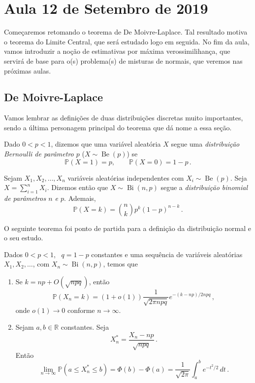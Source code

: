 \section{Aula 12 de Setembro de 2019}
\label{2019_09_12}

Começaremos retomando o teorema de De Moivre-Laplace. Tal resultado motiva o teorema do Limite Central, que será estudado logo em seguida. No fim da aula, vamos introduzir a noção de estimativas por máxima verossimilihança, que servirá de base para o(s) problema(s) de misturas de normais, que veremos nas próximas aulas.


\subsection{De Moivre-Laplace}

Vamos lembrar as definições de duas distribuições discretas muito importantes, sendo a última personagem principal do teorema que dá nome a essa seção.

\begin{definicao}
	Dado $0<p<1$, dizemos que uma variável aleatória $X$ segue uma \emph{distribuição Bernoulli de parâmetro $p$} ($X\sim \operatorname{Be}(p)$) se 
	\[
		\mathbb{P}(X=1) = p, \qquad \mathbb{P}(X=0) = 1-p\,.
	\]
\end{definicao}

\begin{definicao}
	Sejam $X_1, X_2, \dotsc, X_n$ variáveis aleatórias independentes com $X_i\sim \operatorname{Be}(p)$. Seja $X = \sum_{i=1}^{n}X_i$. Dizemos então que $X\sim \operatorname{Bi}(n,p)$ segue a \emph{distribuição binomial de parâmetros $n$ e $p$}.
	Ademais,
	\[
		\mathbb{P}(X = k) = \binom{n}{k}p^k(1-p)^{n-k}\,.
	\]
\end{definicao}

O seguinte teorema foi ponto de partida para a definição da distribuição normal e o seu estudo.

\begin{teorema}
	\label{dml}
	Dados $0<p<1$, \ $q = 1 - p$ constantes e uma sequência de variáveis aleatórias $X_1, X_2, \dotsc$, com $X_n\sim \operatorname{Bi}(n,p)$, temos que 
	
	\begin{enumerate}[label = \rmlabel]
		\item \label{dml1} Se $k = np + O(\sqrt{npq})$, então
		\[
			\mathbb{P}(X_n=k) = (1+o(1))\frac{1}{\sqrt{2\pi npq}}e^{-(k-np)/2npq}\,,
		\]
		onde $o(1)\rightarrow0$ conforme $n\rightarrow\infty$.
		
		\item \label{dml2} Sejam $a,b\in\mathbb{R}$ constantes. Seja
		\[
			X_n^{*} = \frac{X_n-np}{\sqrt{npq}}\,.  
		\] 
		Então
		\begin{equation}
			\label{eqn:conv_dml}
			\lim_{n\rightarrow\infty}\mathbb{P}(a\leq X_n^{*}\leq b) = \Phi(b) - \Phi(a) = \frac{1}{\sqrt{2\pi}}\int_{a}^{b}e^{-t^2/2}\,dt\,.
		\end{equation}
	\end{enumerate}
\end{teorema}


